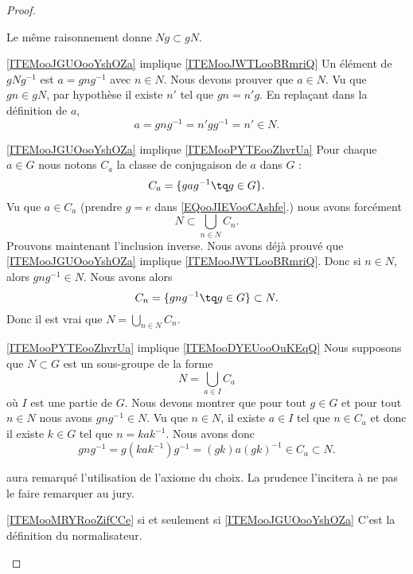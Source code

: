 \begin{proof}
\begin{subproof}
        Le même raisonnement donne \( Ng\subset gN\).
    \item[\ref{ITEMooJGUOooYshOZa} implique \ref{ITEMooJWTLooBRmriQ}]
        Un élément de \( g Ng^{-1}\) est \( a=gng^{-1}\) avec \( n\in N\). Nous devons prouver que \( a\in N\). Vu que \( gn\in gN\), par hypothèse il existe \( n'\) tel que \( gn=n'g\). En replaçant dans la définition de \( a\),
        \begin{equation}
            a=gng^{-1}=n'gg^{-1}=n'\in N.
        \end{equation}
    \item[\ref{ITEMooJGUOooYshOZa} implique \ref{ITEMooPYTEooZhvrUa}]
        Pour chaque \( a\in G\) nous notons \( C_a\) la classe de conjugaison de \( a\) dans \( G\) :
        \begin{equation}        \label{EQooJIEVooCAshfe}
            C_a=\{ gag^{-1}\tq g\in G \}.
        \end{equation}
        Vu que \( a\in C_a\) (prendre \( g=e\) dans \eqref{EQooJIEVooCAshfe}.) nous avons forcément
        \begin{equation}
            N\subset\bigcup_{n\in N}C_n.
        \end{equation}
        Prouvons maintenant l'inclusion inverse. Nous avons déjà prouvé que \ref{ITEMooJGUOooYshOZa} implique \ref{ITEMooJWTLooBRmriQ}. Donc si \( n\in N\), alors \( gng^{-1}\in N\). Nous avons alors
        \begin{equation}
            C_n=\{ gng^{-1}\tq g\in G \}\subset N.
        \end{equation}
        Donc il est vrai que \( N=\bigcup_{n\in N}C_n\).
    \item[\ref{ITEMooPYTEooZhvrUa} implique \ref{ITEMooDYEUooOuKEqQ}]
        Nous supposons que \( N\subset G\) est un sous-groupe de la forme
        \begin{equation}
            N=\bigcup_{a\in I}C_a
        \end{equation}
        où \( I\) est une partie de \( G\). Nous devons montrer que pour tout \( g\in G\) et pour tout \( n\in N\) nous avons \( gng^{-1}\in N\). Vu que \( n\in N\), il existe \( a\in I\) tel que \( n\in C_a\) et donc il existe \( k\in G\) tel que \( n=kak^{-1}\). Nous avons donc
        \begin{equation}
            gng^{-1}=g(kak^{-1})g^{-1}=(gk)a(gk)^{-1}\in C_a\subset N.
        \end{equation}

         aura remarqué l'utilisation de l'axiome du choix. La prudence l'incitera à ne pas le faire remarquer au jury.
    \item[\ref{ITEMooMRYRooZifCCe} si et seulement si \ref{ITEMooJGUOooYshOZa}]
        C'est la définition du normalisateur.
    \end{subproof}
\end{proof}

